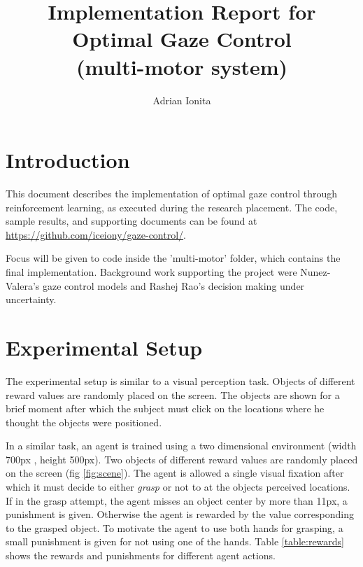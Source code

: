 \documentclass[11]{article}
\author{Adrian Ionita}
\title { Implementation Report for\\
Optimal Gaze Control\\
  \normalsize (multi-motor system) }
\begin{document}
\maketitle 	

\section{Introduction}
This document describes the implementation of optimal gaze control through reinforcement learning, as executed during the research placement. The code, sample results, and supporting documents can be found at \\
\href{url}{https://github.com/iceiony/gaze-control/}. 

Focus will be given to code inside the 'multi-motor' folder, which contains the final implementation. Background work supporting the project were Nunez-Valera's gaze control models\cite{nunezvalera} and Rashej Rao's decision making under uncertainty\cite{rashejrao}.

\section{Experimental Setup}
The experimental setup is similar to a visual perception task. Objects of different reward values are randomly placed on the screen. The objects are shown for a brief moment after which the subject must click on the locations where he thought the objects were positioned. 

In a similar task, an agent is trained using a two dimensional environment (width 700px , height 500px). Two objects of different reward values are randomly placed on the screen (fig \ref{fig:scene}). The agent is allowed a single visual fixation after which it must decide to either \textit{grasp} or not to at the objects perceived locations. If in the grasp attempt, the agent misses an object center by more than 11px, a punishment is given. Otherwise the agent is rewarded by the value corresponding to the grasped object.  To motivate the agent to use both hands for grasping, a small punishment is given for not using one of the hands. Table \ref{table:rewards} shows the rewards and punishments for different agent actions.
\end{document}
